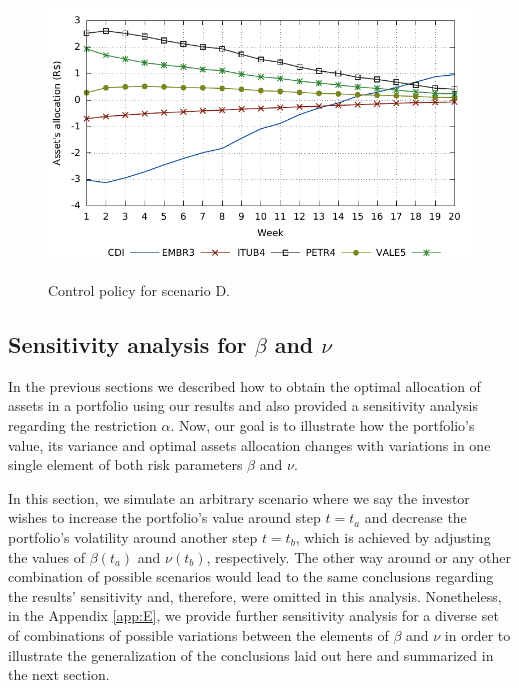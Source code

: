 %
\begin{figure} [H]
	\caption{Control policy for scenario D.}
	\centering
	\includegraphics[width=6in,keepaspectratio]{figures/u_D}
	\label{fig:u4}
\end{figure}


\subsection{Sensitivity analysis for $\beta$ and $\nu$} \label{specific}


In the previous sections we described how to obtain the optimal allocation of assets in a portfolio using our results and also provided a sensitivity analysis regarding the restriction $\alpha$.
Now, our goal is to illustrate how the portfolio's value, its variance and optimal assets allocation changes with variations in one single element of both risk parameters $\beta$ and $\nu$.

In this section, we simulate an arbitrary scenario where we say the investor wishes to increase the portfolio's value around step $t=t_a$ and decrease the portfolio's volatility around another step $t=t_b$, which is achieved by adjusting the values of $\beta(t_a)$ and $\nu(t_b)$, respectively.
%
The other way around or any other combination of possible scenarios would lead to the same conclusions regarding the results' sensitivity and, therefore, were omitted in this analysis.
Nonetheless, in the Appendix \ref{app:E}, we provide further sensitivity analysis for a diverse set of combinations of possible variations between the elements of $\beta$ and $\nu$ in order to illustrate the generalization of the conclusions laid out here and summarized in the next section.

